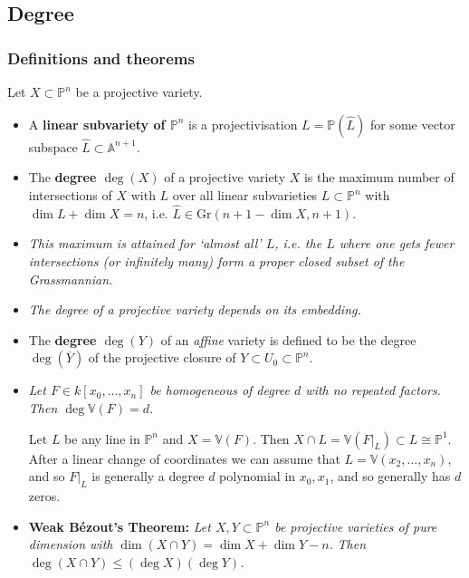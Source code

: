 \documentclass[10pt]{article}
\newcommand{\van}{\mathbb{V}}
\newcommand{\aff}{\mathbb{A}}
\newcommand{\kzn}{{k[x_0,\ldots,x_n]}}
\newcommand{\pee}{\mathbb{P}}
\begin{document}
        \subsection{Degree}

            \subsubsection{Definitions and theorems}

                Let $X\subset\pee^n$ be a projective variety.

                \begin{itemize}
                    \item A \textbf{linear subvariety of $\pee^n$} is a projectivisation $L=\pee(\widehat{L})$ for some vector subspace $\widehat{L}\subset\aff^{n+1}$.
                    \item The \textbf{degree $\deg(X)$} of a projective variety $X$ is the maximum number of intersections of $X$ with $L$ over all linear subvarieties $L\subset\pee^n$ with $\dim L+\dim X=n$, i.e. $\widehat{L}\in\mathrm{Gr}(n+1-\dim X,n+1)$.
                    \item \emph{This maximum is attained for `almost all' $L$, i.e. the $L$ where one gets fewer intersections (or infinitely many) form a proper closed subset of the Grassmannian.}
                    \item \emph{The degree of a projective variety depends on its embedding.}
                    \item The \textbf{degree $\deg(Y)$} of an \emph{affine} variety is defined to be the degree $\deg(\overline{Y})$ of the projective closure of $Y\subset U_0\subset\pee^n$.
                    \item \emph{Let $F\in\kzn$ be homogeneous of degree $d$ with no repeated factors.}
                        \emph{Then $\deg\van(F)=d$.}

                        Let $L$ be any line in $\pee^n$ and $X=\van(F)$.
                        Then $X\cap L=\van(F|_L)\subset L\cong\pee^1$.
                        After a linear change of coordinates we can assume that $L=\van(x_2,\ldots,x_n)$, and so $F|_L$ is generally a degree $d$ polynomial in $x_0,x_1$, and so generally has $d$ zeros.

                    \item \textbf{Weak Bézout's Theorem:} \emph{Let $X,Y\subset\pee^n$ be projective varieties of \emph{pure dimension} with $\dim(X\cap Y)=\dim X+\dim Y-n$.}
                        \emph{Then $\deg(X\cap Y)\leqslant(\deg X)(\deg Y)$.}
                \end{itemize}
\end{document}
